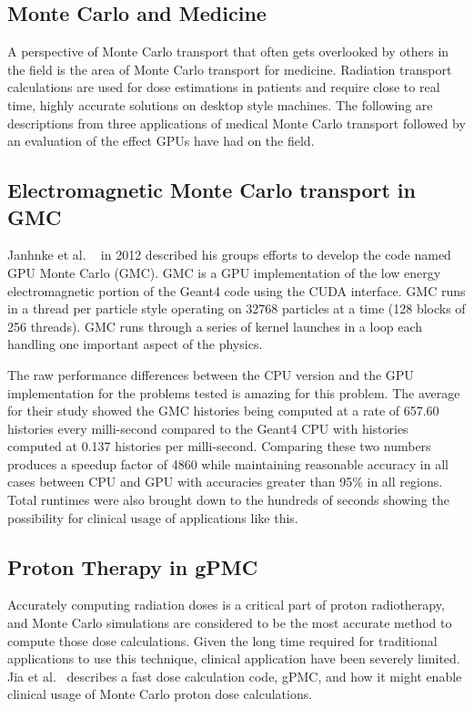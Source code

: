 \subsection{\textbf{Monte Carlo and Medicine}}

A perspective of Monte Carlo transport that often gets overlooked by others in the field is the area of Monte Carlo transport for medicine.
%
Radiation transport calculations are used for dose estimations in patients and require close to real time, highly accurate solutions on desktop style machines.
%
The following are descriptions from three applications of medical Monte Carlo transport followed by an evaluation of the effect GPUs have had on the field.

\subsection*{ Electromagnetic Monte Carlo transport in GMC}

Janhnke et al. ~\cite{jahnke2012gmc} in 2012 described his groups efforts to develop the code named GPU Monte Carlo (GMC).
%
GMC is a GPU implementation of the low energy electromagnetic portion of the Geant4 code using the CUDA interface.
%
GMC runs in a thread per particle style operating on 32768 particles at a time (128 blocks of 256 threads).
%
GMC runs through a series of kernel launches in a loop each handling one important aspect of the physics.

The raw performance differences between the CPU version and the GPU implementation for the problems tested is amazing for this problem.
%
The average for their study showed the GMC histories being computed at a rate of 657.60 histories every milli-second compared to the Geant4 CPU with histories computed at 0.137 histories per milli-second.
%
Comparing these two numbers produces a speedup factor of 4860 while maintaining reasonable accuracy in all cases between CPU and GPU with accuracies greater than 95\% in all regions.
%
Total runtimes were also brought down to the hundreds of seconds showing the possibility for clinical usage of applications like this.~\cite{jahnke2012gmc}

\subsection*{ Proton Therapy in gPMC}

Accurately computing radiation doses is a critical part of proton radiotherapy, and Monte Carlo simulations are considered to be the most accurate method to compute those dose calculations.
%
Given the long time required for traditional applications to use this technique, clinical application have been severely limited.
%
Jia et al.~\cite{jia2012gpu} describes a fast dose calculation code, gPMC, and how it might enable clinical usage of Monte Carlo proton dose calculations.

